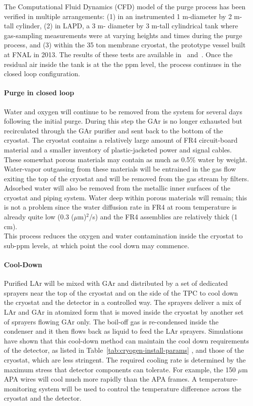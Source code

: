 The Computational Fluid Dynamics (CFD) model of the purge process has been verified in multiple arrangements: (1) in an instrumented 1 m-diameter by 2 m-tall cylinder, (2) in LAPD, a 3 m- diameter by 3 m-tall cylindrical tank where gas-sampling measurements were at varying heights and times during the purge process, and (3) within the 35 ton membrane cryostat, the prototype vessel built at FNAL in 2013. The results of these tests are available in~\cite{lar1-nd-35-ton-talk} and~\cite{CFD_verification-lapd}. 
%
Once the residual air inside the tank is at the the ppm level, the process continues in the closed loop configuration. 

\paragraph{Purge in closed loop}

Water and oxygen will continue to be removed from the system for several days following the initial purge. During this step the GAr is no longer exhausted but recirculated through the GAr purifier and sent back to the bottom of the cryostat. The cryostat contains a relatively large amount of FR4 circuit-board material and a smaller inventory of plastic-jacketed power and signal cables. These somewhat porous materials may contain as much as 0.5\% water by weight. Water-vapor outgassing from these materials will be entrained in the gas flow exiting the top of the cryostat and will be removed from the gas stream by filters. Adsorbed water will also be removed from the metallic inner surfaces of the cryostat and piping system. Water deep within porous materials will remain; this is not a problem since the water diffusion rate in FR4 at room temperature is already quite low (0.3 ($\mu$m)$^2$/s) and the FR4 assemblies are relatively thick (1 cm).\\
%
This process reduces the oxygen and water contamination inside the cryostat to sub-ppm levels, at which point the cool down may commence.

\paragraph{Cool-Down}

Purified LAr will be mixed with GAr and distributed by a set of dedicated sprayers near the top of the cryostat and on the side of the TPC to cool down the cryostat and the detector in a controlled way. The sprayers deliver a mix of LAr and GAr in atomized form that is moved inside the cryostat by another set of sprayers flowing GAr only. The boil-off gas is re-condensed inside the condenser and it then flows back as liquid to feed the LAr sprayers. Simulations have shown that this cool-down method can maintain the cool down requirements of the detector, as listed in Table~\ref{tab:cryogen-install-params} , and those of the cryostat, which are less stringent. The required cooling rate is determined by the maximum stress that detector components can tolerate. For example, the 150 $\mu$m APA wires will cool much more rapidly than the APA frames. A temperature-monitoring system will be used to control the temperature difference across the cryostat and the detector.

